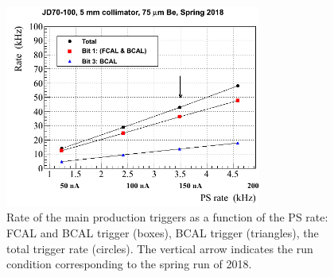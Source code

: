 
\begin{figure}[tbp]
\begin{center}
\includegraphics[width=0.75\textwidth]{figures/Rate_diamond_2018.png}  
\caption{Rate of the main production triggers as a function of the PS rate: FCAL and BCAL trigger (boxes), BCAL trigger (triangles), the total trigger rate (circles). The vertical arrow indicates the run condition corresponding to the spring run of 2018.} \label{fig:trig_rate}
\end{center}
\end{figure}
